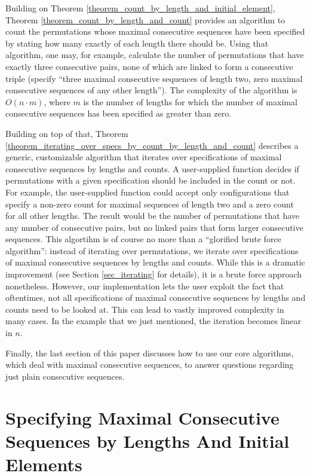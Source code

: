 \documentclass{article}
\begin{document}
Building on Theorem \ref{theorem_count_by_length_and_initial_element}, Theorem \ref{theorem_count_by_length_and_count}
provides an algorithm to count the permutations whose maximal consecutive sequences have been specified by
stating how many exactly of each length there should be. Using that algorithm, one may, for example,
calculate the number of permutations that have exactly three consecutive pairs, none of which are linked
to form a consecutive triple (specify ``three maximal consecutive sequences of length two, zero maximal
consecutive sequences of any other length''). The complexity of the algorithm is $O(n\cdot m)$, where
$m$ is the number of lengths for which the number of maximal consecutive sequences has been specified
as greater than zero.

Building on top of that, Theorem \ref{theorem_iterating_over_specs_by_count_by_length_and_count}
describes a generic, customizable algorithm
that iterates over specifications of maximal consecutive sequences by lengths and counts.
A user-supplied function decides if permutations with a given specification should be included in the count or not.
For example, the user-supplied function could accept only configurations that specify a non-zero count for maximal
sequences of length two and a zero count for all other lengths.
The result would be the number of permutations that have any number of consecutive pairs, but no linked pairs
that form larger consecutive sequences. This algortihm is of course no more than a ``glorified brute force
algorithm'': instead of iterating over permutations, we iterate over specifications of maximal consecutive sequences
by lengths and counts. While this is a dramatic improvement (see Section \ref{sec_iterating} for details), it
is a brute force approach nonetheless. However, our implementation lets the user exploit the fact that oftentimes,
not all specifications of maximal consecutive sequences by lengths and counts need to be looked at.
This can lead to vastly improved complexity in many cases. In the example that we just mentioned, the iteration
becomes linear in $n$.

Finally, the last section of this paper discusses how to use our core algorithms, which deal with
maximal consecutive sequences, to answer questions regarding just plain consecutive sequences.

\section{Specifying Maximal Consecutive Sequences by Lengths And Initial Elements}
\end{document}
